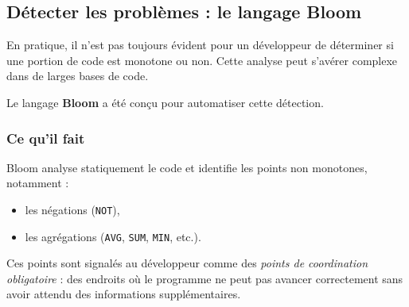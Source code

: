 \documentclass[12pt,a4paper]{article}
\begin{document}
\subsection{Détecter les problèmes : le langage Bloom}

En pratique, il n'est pas toujours évident pour un développeur de déterminer si
une portion de code est monotone ou non. Cette analyse peut s'avérer complexe
dans de larges bases de code.

Le langage \textbf{Bloom} a été conçu pour automatiser cette détection.

\subsubsection{Ce qu'il fait}

Bloom analyse statiquement le code et identifie les points non monotones, notamment :
\begin{itemize}
    \item les négations (\texttt{NOT}),
    \item les agrégations (\texttt{AVG}, \texttt{SUM}, \texttt{MIN}, etc.).
\end{itemize}

Ces points sont signalés au développeur comme des \textit{points de coordination
obligatoire} : des endroits où le programme ne peut pas avancer correctement
sans avoir attendu des informations supplémentaires.

\begin{center}
\end{center}
\end{document}

